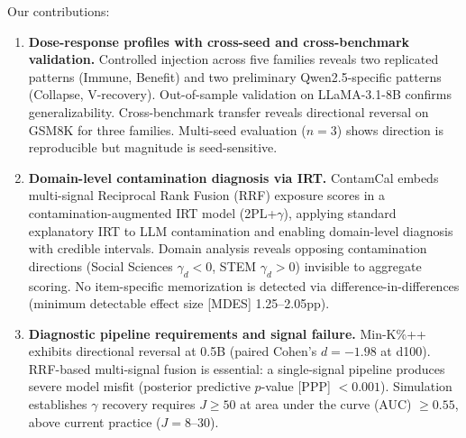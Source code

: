 Our contributions:
\begin{enumerate}
    \item \textbf{Dose-response profiles with cross-seed and cross-benchmark validation.} Controlled injection across five families reveals two replicated patterns (Immune, Benefit) and two preliminary Qwen2.5-specific patterns (Collapse, V-recovery). Out-of-sample validation on LLaMA-3.1-8B confirms generalizability. Cross-benchmark transfer reveals directional reversal on GSM8K for three families. Multi-seed evaluation ($n\!=\!3$) shows direction is reproducible but magnitude is seed-sensitive.
    \item \textbf{Domain-level contamination diagnosis via IRT.} ContamCal embeds multi-signal Reciprocal Rank Fusion (RRF) exposure scores in a contamination-augmented IRT model (2PL+$\gamma$), applying standard explanatory IRT \citep{deboeck_2004_explanatory_irt} to LLM contamination and enabling domain-level diagnosis with credible intervals. Domain analysis reveals opposing contamination directions (Social Sciences $\gamma_d < 0$, STEM $\gamma_d > 0$) invisible to aggregate scoring. No item-specific memorization is detected via difference-in-differences (minimum detectable effect size [MDES] 1.25--2.05pp).
    \item \textbf{Diagnostic pipeline requirements and signal failure.} Min-K\%++ \citep{zhang_2024_minkpp} exhibits directional reversal at 0.5B (paired Cohen's $d = -1.98$ at d100). RRF-based multi-signal fusion is essential: a single-signal pipeline produces severe model misfit (posterior predictive $p$-value [PPP] $< 0.001$). Simulation establishes $\gamma$ recovery requires $J \geq 50$ at area under the curve (AUC) $\geq 0.55$, above current practice ($J = 8$--$30$).
\end{enumerate}

